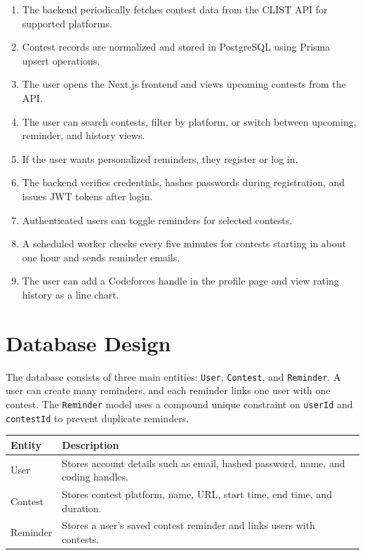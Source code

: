 \documentclass[12pt,a4paper]{report}
\begin{document}
\begin{normalsize}
\begin{enumerate}
    \item The backend periodically fetches contest data from the CLIST API for supported platforms.
    \item Contest records are normalized and stored in PostgreSQL using Prisma upsert operations.
    \item The user opens the Next.js frontend and views upcoming contests from the API.
    \item The user can search contests, filter by platform, or switch between upcoming, reminder, and history views.
    \item If the user wants personalized reminders, they register or log in.
    \item The backend verifies credentials, hashes passwords during registration, and issues JWT tokens after login.
    \item Authenticated users can toggle reminders for selected contests.
    \item A scheduled worker checks every five minutes for contests starting in about one hour and sends reminder emails.
    \item The user can add a Codeforces handle in the profile page and view rating history as a line chart.
\end{enumerate}

\section{Database Design}

The database consists of three main entities: \texttt{User}, \texttt{Contest}, and \texttt{Reminder}. A user can create many reminders, and each reminder links one user with one contest. The \texttt{Reminder} model uses a compound unique constraint on \texttt{userId} and \texttt{contestId} to prevent duplicate reminders.

\begin{center}
\begin{tabular}{|p{3cm}|p{9.5cm}|}
\hline
\textbf{Entity} & \textbf{Description} \\
\hline
User & Stores account details such as email, hashed password, name, and coding handles. \\
\hline
Contest & Stores contest platform, name, URL, start time, end time, and duration. \\
\hline
Reminder & Stores a user's saved contest reminder and links users with contests. \\
\hline
\end{tabular}
\end{center}


\end{normalsize}
\end{document}
